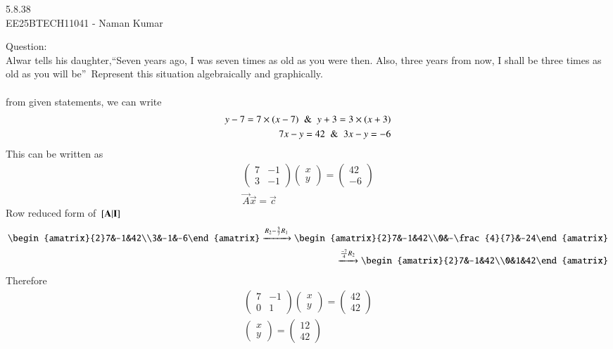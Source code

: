 \documentclass[journal]{IEEEtran}
\author{EE25BTECH11041-Naman Kumar }
\begin{document}
\begin{center}
    \huge{5.8.38}\\
    \large{EE25BTECH11041 - Naman Kumar}
\end{center}
Question:\\
Alwar tells his daughter,``Seven years ago, I was seven times as old as you were then. Also, three years from now, I shall be three times as old as you will be''\ Represent this situation algebraically and graphically.\\
\solution \\

from given statements, we can write
\begin{align}
    y-7=7\times(x-7)\And y+3=3\times(x+3)\\
    7x-y=42\And3x-y=-6
\end{align}
This can be written as
\begin{align}
\begin{pmatrix}7&-1\\3&-1\end{pmatrix}\begin{pmatrix}x\\y\end{pmatrix}=\begin{pmatrix}42\\-6\end{pmatrix}\\
\vec{A}\vec{x}=\vec{c}
\end{align}
Row reduced form of ${}\left[\mathbf{A}\vert \mathbf{I}\right]$
\begin{align}
    \begin{amatrix}{2}7&-1&42\\3&-1&-6\end{amatrix}\xrightarrow[]{R_2-\frac{3}{7}R_1}\begin{amatrix}{2}7&-1&42\\0&-\frac{4}{7}&-24\end{amatrix}\\
    \xrightarrow[]{\frac{-7}{4}R_2}\begin{amatrix}{2}7&-1&42\\0&1&42\end{amatrix}
\end{align}
Therefore
\begin{align}
    \begin{pmatrix}7&-1\\0&1\end{pmatrix}\begin{pmatrix}x\\y\end{pmatrix}=\begin{pmatrix}42\\42\end{pmatrix}\\
    \begin{pmatrix}x\\y\end{pmatrix}=\begin{pmatrix}12\\42\end{pmatrix}
\end{align}
\end{document}
